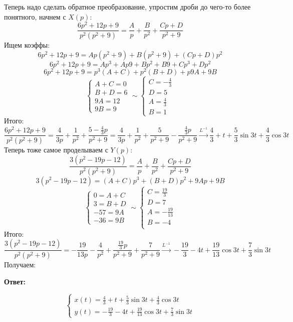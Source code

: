 \documentclass[a4paper,12pt]{article}
\begin{document}
Теперь надо сделать обратное преобразование, упростим дроби до чего-то более понятного, начнем с $X(p)$:
\[
\frac{6p^2 + 12p + 9}{p^2(p^2 + 9)} = \frac{A}{p} + \frac{B}{p^2} + \frac{Cp + D}{p^2 + 9}
\]
Ищем коэффы:
\[
6p^2 + 12p + 9 = Ap(p^2 + 9) + B(p^2 + 9) + (Cp+D)p^2
\]
\[
6p^2 + 12p + 9  = Ap^3 + Ap9 + Bp^2 + B9 + Cp^3 + Dp^2
\]
\[
6p^2 + 12p + 9  = p^3(A + C) + p^2(B + D) + p9A + 9B
\]
\[
\begin{cases}
A + C = 0 \\
B + D = 6 \\
9A = 12 \\
9B = 9
\end{cases} \sim 
\begin{cases}
C = - \frac{4}{3}\\
D = 5 \\
A = \frac{4}{3} \\
B = 1
\end{cases}
\]
Итого:
\[
\frac{6p^2 + 12p + 9}{p^2(p^2 + 9)} = \frac{4}{3p} + \frac{1}{p^2} + \frac{5 - \frac{4}{3}p}{p^2 + 9}  =  \frac{4}{3p} + \frac{1}{p^2} + \frac{5}{p^2 + 9}  - \frac{\frac{4}{3}p}{p^2 + 9}  \overset{L^{-1}}{\longrightarrow} \frac{4}{3} + t + \frac{5}{3} \sin 3t + \frac{4}{3} \cos 3t
\]
Теперь тоже самое проделываем с $Y(p)$:
\[
 \frac{3(p^2 - 19p -12)}{p^2(p^2 + 9)} = \frac{A}{p} + \frac{B}{p^2} + \frac{Cp + D}{p^2 + 9}
\]
\[
 3(p^2 - 19p -12) = (A + C)p^3 + (B + D)p^2 + 9Ap + 9B
\]
\[
\begin{cases}
0 = A + C \\
3 = B + D \\
-57 = 9A \\
-36 = 9B
\end{cases} \sim 
\begin{cases}
C = \frac{19}{3} \\
D = 7\\
A = - \frac{19}{13}\\
B = -4\\
\end{cases}
\]
Итого:
\[
\frac{3(p^2 - 19p -12)}{p^2(p^2 + 9)} = -\frac{19}{13p} - \frac{4}{p^2} +  \frac{\frac{19}{3}p}{p^2+ 9} + \frac{7}{p^2 + 9} \overset{L^{-1}}{\longrightarrow} - \frac{19}{3} - 4t + \frac{19}{13} \cos 3t + \frac{7}{3} \sin 3t
\]
Получаем:
\begin{center}
\textbf{Ответ: } 
\end{center}
\[
\begin{cases}
x(t) = \frac{4}{3} + t + \frac{5}{3} \sin 3t + \frac{4}{3} \cos 3t \\
y(t) = - \frac{19}{3} - 4t + \frac{19}{13} \cos 3t + \frac{7}{3} \sin 3t
\end{cases}
\]
\clearpage
\end{document}

